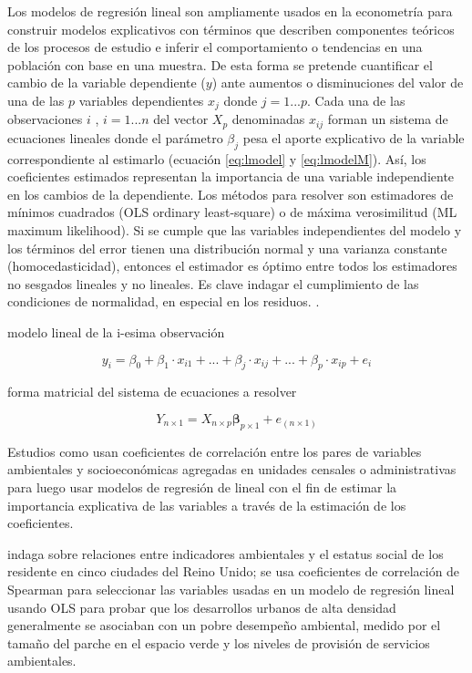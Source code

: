 \documentclass[12pt,]{book}
\begin{document}
Los modelos de regresión lineal son ampliamente usados en la econometría
para construir modelos explicativos con términos que describen
componentes teóricos de los procesos de estudio e inferir el
comportamiento o tendencias en una población con base en una muestra. De
esta forma se pretende cuantificar el cambio de la variable dependiente
(\(y\)) ante aumentos o disminuciones del valor de una de las \(p\)
variables dependientes \(x_j\) donde \(j =1...p\). Cada una de las
observaciones \(i\) , \(i=1...n\) del vector \(X_p\) denominadas
\(x_{ij}\) forman un sistema de ecuaciones lineales donde el parámetro
\(\beta_j\) pesa el aporte explicativo de la variable correspondiente al
estimarlo (ecuación \eqref{eq:lmodel} y \eqref{eq:lmodelM}). Así, los
coeficientes estimados representan la importancia de una variable
independiente en los cambios de la dependiente. Los métodos para
resolver son estimadores de mínimos cuadrados (OLS ordinary
least-square) o de máxima verosimilitud (ML maximum likelihood). Si se
cumple que las variables independientes del modelo y los términos del
error tienen una distribución normal y una varianza constante
(homocedasticidad), entonces el estimador es óptimo entre todos los
estimadores no sesgados lineales y no lineales. Es clave indagar el
cumplimiento de las condiciones de normalidad, en especial en los
residuos. \citep{gibbons_mostly_2012}.

modelo lineal de la i-esima observación

\begin{equation}
y_i=\beta_0+ \beta_1\cdot  x_{i1}+...+\beta_j\cdot  x_{ij}+...+\beta_p\cdot  x_{ip}+e_i
\label{eq:lmodel}
\end{equation}

forma matricial del sistema de ecuaciones a resolver

\begin{equation}
Y_{n\times 1}=X_{n \times p }\mathbf{\beta}_{p\times 1}+e_{(n\times 1)}
\label{eq:lmodelM}
\end{equation}

Estudios como
\citep{heynen_political_2006, vasquez_fuentes_vegetacion_2008} usan
coeficientes de correlación entre los pares de variables ambientales y
socioeconómicas agregadas en unidades censales o administrativas para
luego usar modelos de regresión de lineal con el fin de estimar la
importancia explicativa de las variables a través de la estimación de
los coeficientes.

\citet{tratalos_urban_2007} indaga sobre relaciones entre indicadores
ambientales y el estatus social de los residente en cinco ciudades del
Reino Unido; se usa coeficientes de correlación de Spearman para
seleccionar las variables usadas en un modelo de regresión lineal usando
OLS para probar que los desarrollos urbanos de alta densidad
generalmente se asociaban con un pobre desempeño ambiental, medido por
el tamaño del parche en el espacio verde y los niveles de provisión de
servicios ambientales.
\end{document}
